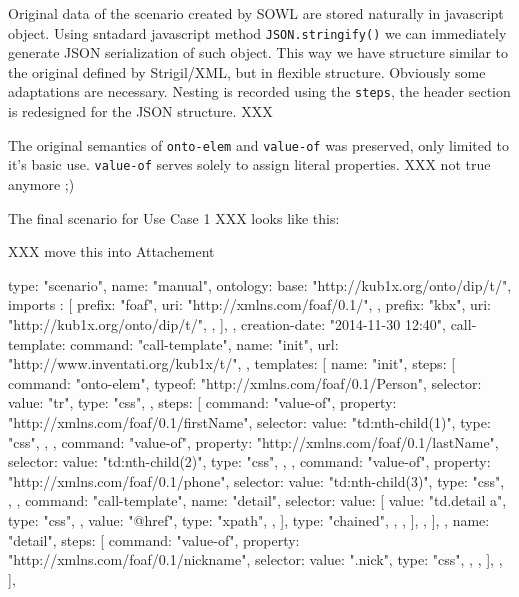 Original data of the scenario created by SOWL are stored naturally in
javascript object. Using sntadard javascript method {\tt JSON.stringify()} we
can immediately generate JSON serialization of such object. This way we have
structure similar to the original defined by Strigil/XML, but in flexible
structure. Obviously some adaptations are necessary. Nesting is recorded using
the {\tt steps}, the header section is redesigned for the JSON structure. XXX

The original semantics of {\tt onto-elem} and {\tt value-of} was preserved,
only limited to it's basic use. {\tt value-of} serves solely to assign literal
properties. XXX not true anymore ;) 

The final scenario for Use Case 1 XXX looks like this: 

XXX move this into Attachement

\begtt
{
  type: "scenario", 
  name: "manual", 
  ontology: {
    base: "http://kub1x.org/onto/dip/t/", 
    imports : [
      {
        prefix: "foaf", 
        uri: "http://xmlns.com/foaf/0.1/", 
      }, 
      {
        prefix: "kbx", 
        uri: "http://kub1x.org/onto/dip/t/", 
      }, 
    ], 
  }, 
  creation-date: "2014-11-30 12:40", 
  call-template: {
    command: "call-template", 
    name: "init", 
    url: "http://www.inventati.org/kub1x/t/", 
  }, 
  templates: [
    {
      name: "init", 
      steps: [
        {
          command: "onto-elem", 
          typeof: "http://xmlns.com/foaf/0.1/Person", 
          selector: {
            value: "tr", 
            type: "css", 
          }, 
          steps: [
            {
              command: "value-of", 
              property: "http://xmlns.com/foaf/0.1/firstName", 
              selector: {
                value: "td:nth-child(1)", 
                type: "css", 
              }, 
            }, 
            {
              command: "value-of", 
              property: "http://xmlns.com/foaf/0.1/lastName", 
              selector: {
                value: "td:nth-child(2)", 
                type:  "css", 
              }, 
            }, 
            {
              command: "value-of", 
              property: "http://xmlns.com/foaf/0.1/phone", 
              selector: {
                value: "td:nth-child(3)", 
                type:  "css", 
              }, 
            },
            {
              command: "call-template", 
              name: "detail", 
              selector: {
                value: [
                  {
                    value: "td.detail a", 
                    type:  "css", 
                  }, 
                  {
                    value: "@href", 
                    type: "xpath", 
                  }, 
                ], 
                type: "chained", 
              }, 
            }, 
          ], 
        }, 
      ], 
    }, 
    {
      name: "detail", 
      steps: [
        {
          command: "value-of", 
          property: "http://xmlns.com/foaf/0.1/nickname", 
          selector: {
            value: ".nick", 
            type:  "css", 
          }, 
        },
      ], 
    }, 
  ], 
}
\endtt

